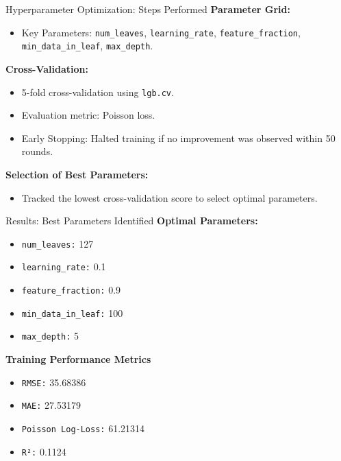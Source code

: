 \documentclass{beamer}\usepackage[]{graphicx}\usepackage[]{xcolor}
\begin{document}
\begin{frame}{Hyperparameter Optimization: Steps Performed}
\textbf{Parameter Grid:}
\begin{itemize}
    \item Key Parameters: \texttt{num\_leaves}, \texttt{learning\_rate}, \texttt{feature\_fraction}, \texttt{min\_data\_in\_leaf}, \texttt{max\_depth}.
\end{itemize}

\textbf{Cross-Validation:}
\begin{itemize}
    \item 5-fold cross-validation using \texttt{lgb.cv}.
    \item Evaluation metric: Poisson loss.
    \item Early Stopping: Halted training if no improvement was observed within 50 rounds.
\end{itemize}

\textbf{Selection of Best Parameters:}
\begin{itemize}
    \item Tracked the lowest cross-validation score to select optimal parameters.
\end{itemize}
\end{frame}

\begin{frame}{Results: Best Parameters Identified}
\textbf{Optimal Parameters:}
\begin{itemize}
    \item \texttt{num\_leaves:} 127
    \item \texttt{learning\_rate:} 0.1
    \item \texttt{feature\_fraction:} 0.9
    \item \texttt{min\_data\_in\_leaf:} 100
    \item \texttt{max\_depth:} 5
\end{itemize}

\textbf{Training Performance Metrics}
\begin{itemize}
    \item \texttt{RMSE:} 35.68386
    \item \texttt{MAE:} 27.53179
    \item \texttt{Poisson Log-Loss:} 61.21314
    \item \texttt{R²:} 0.1124
\end{itemize}
\end{frame}
\end{document}
